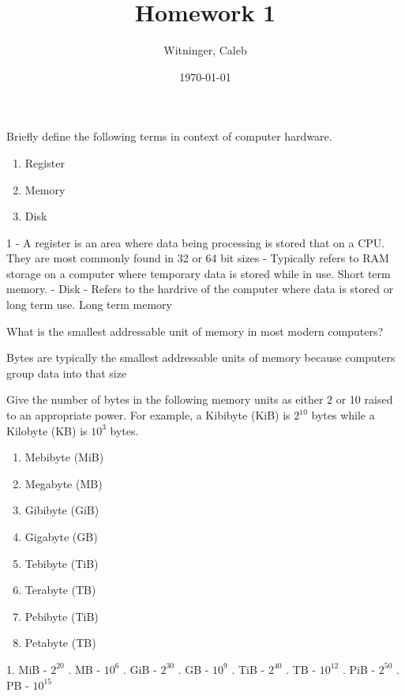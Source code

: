 \documentclass{homework}
\author{Witninger, Caleb}
\date{\today}
\title{Homework 1}
\begin{document}
 \maketitle

\question Briefly define the following terms in context of computer
hardware.

\begin{enumerate}
  \item Register
  \item Memory
  \item Disk
\end{enumerate}

\begin{sol}
 1 - A register is an area where data being processing is stored that on a CPU. They are most commonly found in 32 or 64 bit sizes  - Typically refers to RAM storage on a computer where temporary data is stored while in use. Short term memory. - Disk -  
   Refers to the hardrive of the computer where data is stored or long term use. Long term memory\smallbreak
\end{sol}

\question What is the smallest addressable unit of memory in most modern
computers?

\begin{sol}
Bytes are typically the smallest addressable units of memory because computers group data into that size
\end{sol}

\question Give the number of bytes in the following memory units as either 2
or 10 raised to an appropriate power. For example, a Kibibyte
(KiB) is $2^{10}$ bytes while a Kilobyte (KB) is $10^3$ bytes.

\begin{enumerate}
  \item Mebibyte (MiB)
  \item Megabyte (MB)
  \item Gibibyte (GiB)
  \item Gigabyte (GB)
  \item Tebibyte (TiB)
  \item Terabyte (TB)
  \item Pebibyte (TiB)
  \item Petabyte (TB)
\end{enumerate}

\begin{sol}
1. MiB - $2^{20}$ . MB - $10^{6}$ . GiB - $2^{30}$ . GB - $10^{9}$ . TiB - $2^{40}$ . TB - $10^{12}$ . PiB - $2^{50}$ . PB - $10^{15}$ \smallbreak
\end{sol}
\end{document}
